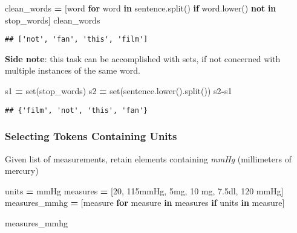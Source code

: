 \documentclass[
]{book}
\newenvironment{Shaded}{\begin{snugshade}}{\end{snugshade}}
\newcommand{\BuiltInTok}[1]{#1}
\newcommand{\ControlFlowTok}[1]{\textcolor[rgb]{0.13,0.29,0.53}{\textbf{#1}}}
\newcommand{\KeywordTok}[1]{\textcolor[rgb]{0.13,0.29,0.53}{\textbf{#1}}}
\newcommand{\NormalTok}[1]{#1}
\newcommand{\OperatorTok}[1]{\textcolor[rgb]{0.81,0.36,0.00}{\textbf{#1}}}
\newcommand{\StringTok}[1]{\textcolor[rgb]{0.31,0.60,0.02}{#1}}
\begin{document}
\begin{Shaded}
\begin{Highlighting}[]
\NormalTok{clean\_words }\OperatorTok{=}\NormalTok{ [word }\ControlFlowTok{for}\NormalTok{ word }\KeywordTok{in}\NormalTok{ sentence.split() }\ControlFlowTok{if}\NormalTok{ word.lower() }\KeywordTok{not} \KeywordTok{in}\NormalTok{ stop\_words]}
\NormalTok{clean\_words}
\end{Highlighting}
\end{Shaded}

\begin{verbatim}
## ['not', 'fan', 'this', 'film']
\end{verbatim}

\textbf{Side note}: this task can be accomplished with sets, if not concerned with multiple instances of the same word.

\begin{Shaded}
\begin{Highlighting}[]
\NormalTok{s1 }\OperatorTok{=} \BuiltInTok{set}\NormalTok{(stop\_words)}
\NormalTok{s2 }\OperatorTok{=} \BuiltInTok{set}\NormalTok{(sentence.lower().split())}
\NormalTok{s2}\OperatorTok{{-}}\NormalTok{s1}
\end{Highlighting}
\end{Shaded}

\begin{verbatim}
## {'film', 'not', 'this', 'fan'}
\end{verbatim}

\subsubsection{Selecting Tokens Containing Units}\label{selecting-tokens-containing-units}

Given list of measurements, retain elements containing \emph{mmHg} (millimeters of mercury)

\begin{Shaded}
\begin{Highlighting}[]
\NormalTok{units }\OperatorTok{=} \StringTok{\textquotesingle{}mmHg\textquotesingle{}}
\NormalTok{measures }\OperatorTok{=}\NormalTok{ [}\StringTok{\textquotesingle{}20\textquotesingle{}}\NormalTok{, }\StringTok{\textquotesingle{}115mmHg\textquotesingle{}}\NormalTok{, }\StringTok{\textquotesingle{}5mg\textquotesingle{}}\NormalTok{, }\StringTok{\textquotesingle{}10 mg\textquotesingle{}}\NormalTok{, }\StringTok{\textquotesingle{}7.5dl\textquotesingle{}}\NormalTok{, }\StringTok{\textquotesingle{}120 mmHg\textquotesingle{}}\NormalTok{]}
\NormalTok{measures\_mmhg }\OperatorTok{=}\NormalTok{ [measure }\ControlFlowTok{for}\NormalTok{ measure }\KeywordTok{in}\NormalTok{ measures }\ControlFlowTok{if}\NormalTok{ units }\KeywordTok{in}\NormalTok{ measure]}

\NormalTok{measures\_mmhg}
\end{Highlighting}
\end{Shaded}
\end{document}
